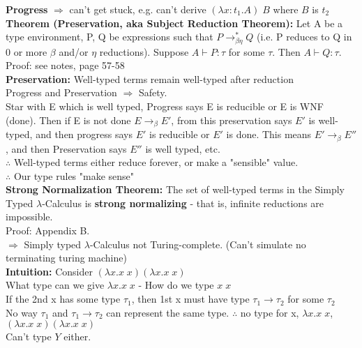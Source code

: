 \documentclass[11pt]{article}
\begin{document}
{\bf Progress} $\Rightarrow$ can't get stuck, e.g. can't derive $(\lambda x:t_1.A)\;B$ where $B$ is $t_2$ \\

{\bf Theorem (Preservation, aka Subject Reduction Theorem):} Let A be a type environment, P, Q be expressions such that $P \rightarrow_{\beta \eta}^* Q$ (i.e. P reduces to Q in 0 or more $\beta$ and/or $\eta$ reductions). Suppose $A \vdash P: \tau$ for some $\tau$. Then $A \vdash Q:\tau$. \\

Proof: see notes, page 57-58 \\

{\bf Preservation:} Well-typed terms remain well-typed after reduction \\

Progress and Preservation $\Rightarrow$ Safety. \\

Star with E which is well typed, Progress says E is reducible or E is WNF (done). Then if E is not done $E \rightarrow_\beta E'$, from this preservation says $E'$ is well-typed, and then progress says $E'$ is reducible or $E'$ is done. This means $E' \rightarrow_\beta E''$, and then Preservation says $E''$ is well typed, etc. \\

$\therefore$ Well-typed terms either reduce forever, or make a "sensible" value. \\

$\therefore$ Our type rules "make sense" \\

{\bf Strong Normalization Theorem:} The set of well-typed terms in the Simply Typed $\lambda$-Calculus is {\bf strong normalizing} - that is, infinite reductions are impossible. \\

Proof: Appendix B. \\

$\Rightarrow$ Simply typed $\lambda$-Calculus not Turing-complete. (Can't simulate no terminating turing machine)\\

{\bf Intuition:} Consider $(\lambda x.x\;x)(\lambda x.x\;x)$ \\

What type can we give $\lambda x.x\;x$ - How do we type $x\;x$\\

If the 2nd x has some type $\tau_1$, then 1st x must have type $\tau_1 \rightarrow \tau_2$ for some $\tau_2$ \\

No way $\tau_1$ and $\tau_1 \rightarrow \tau_2$ can represent the same type. $\therefore$ no type for x, $\lambda x.x\;x$, $(\lambda x.x\;x)(\lambda x.x\;x)$ \\

Can't type $Y$ either. \\
\end{document}
